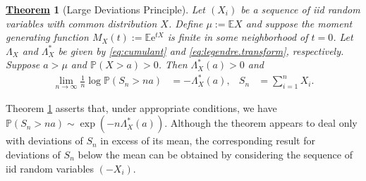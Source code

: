 \documentclass[12pt]{book}
\numberwithin{equation}{chapter}
\theoremstyle{plain}
\newtheorem{theorem}{\underline{Theorem}}
\numberwithin{theorem}{section}
\theoremstyle{definition}
\numberwithin{exercise}{chapter}
\newcommand{\<}{\langle}
\renewcommand{\>}{\rangle}
\renewcommand{\(}{\left(}
\renewcommand{\)}{\right)}
\renewcommand{\[}{\left[}
\renewcommand{\]}{\right]}
\newcommand\Eb{\mathds{E}}
\newcommand\Pb{\mathds{P}}
\newcommand\Lam{\Lambda}
\newcommand\ee{\mathrm{e}}
\begin{document}
\begin{theorem}[Large Deviations Principle]
\label{thm:ldp}
Let $(X_i)$ be a sequence of iid random variables with common distribution $X$.  Define $\mu := \Eb X$ and suppose the moment generating function $M_X(t) := \Eb \ee^{t X}$ is finite in some neighborhood of $t = 0$.  Let $\Lam_X$ and $\Lam_X^*$ be given by \eqref{eq:cumulant} and \eqref{eq:legendre.transform}, respectively.  Suppose $a > \mu$ and $\Pb(X > a ) > 0$.  Then $\Lam_X^*(a) > 0$ and
\begin{align}
\lim_{n \to \infty} \frac{1}{n} \log \Pb ( S_n > n a ) 
	&= - \Lam_X^*(a) , &
S_n
	&=	\sum_{i=1}^n X_i . \label{eq:ldp}
\end{align}
\end{theorem}

\noindent
Theorem \ref{thm:ldp} asserts that, under appropriate conditions, we have $\Pb(S_n > n a) \sim \exp ( - n \Lam_X^*(a) )$.
Although the theorem appears to deal only with deviations of $S_n$ in excess of its mean, the corresponding result for deviations of $S_n$ below the mean can be obtained by considering the sequence of iid random variables $(-X_i)$.
\end{document}
